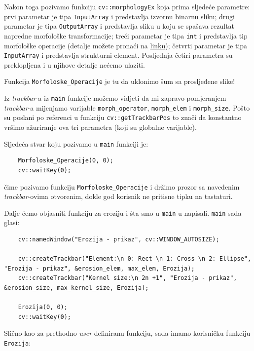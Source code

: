 \documentclass[a4paper, 12pt]{article}
\begin{document}
Nakon toga pozivamo funkciju \lstinline{cv::morphologyEx} koja prima sljedeće parametre: prvi parametar je tipa \lstinline{InputArray} i predstavlja izvornu binarnu sliku; drugi parametar je tipa \lstinline{OutputArray} i predstavlja sliku u koju se spašava rezultat napredne morfološke transformacije; treći parametar je tipa \lstinline{int} i predstavlja tip morfološke operacije (detalje možete pronaći na \href{https://docs.opencv.org/3.4/d4/d86/group__imgproc__filter.html#ga7be549266bad7b2e6a04db49827f9f32}{linku}); četvrti parametar je tipa \lstinline{InputArray} i predstavlja strukturni element. Posljednja četiri parametra su preklopljena i u njihove detalje nećemo ulaziti.

Funkcija \lstinline{Morfoloske_Operacije} je tu da uklonimo šum sa prosljeđene slike!

Iz \textit{trackbar}-a iz \lstinline{main} funkcije možemo vidjeti da mi zapravo pomjeranjem \textit{trackbar}-a mijenjamo varijable \lstinline{morph_operator}, \lstinline{morph_elem} i \lstinline{morph_size}. Pošto su poslani po referenci u funkciju \lstinline{cv::getTrackbarPos} to znači da konstantno vršimo ažuriranje ova tri parametra (koji su globalne varijable). 

Sljedeća stvar koju pozivamo u \lstinline{main} funkciji je:

\begin{lstlisting}
    Morfoloske_Operacije(0, 0);
    cv::waitKey(0);
\end{lstlisting}

čime pozivamo funkciju \lstinline{Morfoloske_Operacije} i držimo prozor sa navedenim \textit{trackbar}-ovima otvorenim, dokle god korisnik ne pritisne tipku na tastaturi.

Dalje ćemo objasniti funkciju za eroziju i šta smo u \lstinline{main}-u napisali. \lstinline{main} sada glasi:

\begin{lstlisting}
    cv::namedWindow("Erozija - prikaz", cv::WINDOW_AUTOSIZE);

    cv::createTrackbar("Element:\n 0: Rect \n 1: Cross \n 2: Ellipse", "Erozija - prikaz", &erosion_elem, max_elem, Erozija);
    cv::createTrackbar("Kernel size:\n 2n +1", "Erozija - prikaz", &erosion_size, max_kernel_size, Erozija);

    Erozija(0, 0);
    cv::waitKey(0);
\end{lstlisting}

Slično kao za prethodno \textit{user} definiranu funkciju, sada imamo korisničku funkciju \lstinline{Erozija}:
\end{document}
